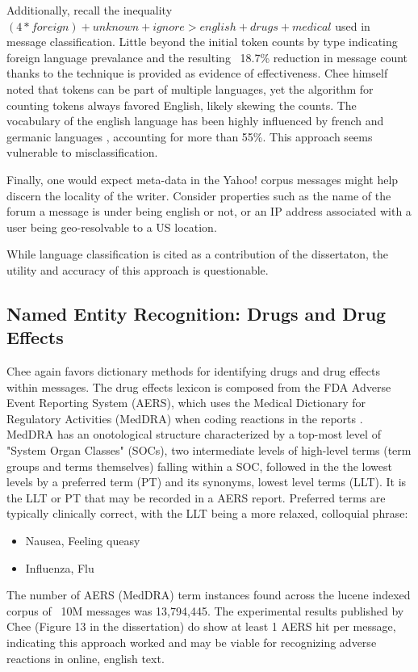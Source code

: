 \documentclass[twoside,11pt]{article}
\begin{document}
Additionally, recall the inequality $(4 * foreign) + unknown + ignore > english + drugs + medical$ used in message classification. Little beyond the initial token counts by type indicating foreign language prevalance and the resulting ~18.7\% reduction in message count thanks to the technique is provided as evidence of effectiveness. Chee himself noted that tokens can be part of multiple languages, yet the algorithm for counting tokens always favored English, likely skewing the counts. The vocabulary of the english language has been highly influenced by french and germanic languages \citep{Wikipedia page for english}, accounting for more than 55\%. This approach seems vulnerable to misclassification.

Finally, one would expect meta-data in the Yahoo! corpus messages might help discern the locality of the writer. Consider properties such as the name of the forum a message is under being english or not, or an IP address associated with a user being geo-resolvable to a US location.

While language classification is cited as a contribution of the dissertaton, the utility and accuracy of this approach is questionable.


\subsection{Named Entity Recognition: Drugs and Drug Effects}
Chee again favors dictionary methods for identifying drugs and drug effects within messages. The drug effects lexicon is composed from the FDA Adverse Event Reporting System (AERS), which uses the Medical Dictionary for Regulatory Activities (MedDRA) when coding reactions in the reports \citep{FAERS}. MedDRA has an onotological structure characterized by a top-most level of "System Organ Classes" (SOCs), two intermediate levels of high-level terms (term groups and terms themselves) falling within a SOC, followed in the the lowest levels by a preferred term (PT) and its synonyms, lowest level terms (LLT). It is the LLT or PT that may be recorded in a AERS report. Preferred terms are typically clinically correct, with the LLT being a more relaxed, colloquial phrase:
\begin{itemize}
  \item Nausea,  Feeling queasy
  \item Influenza,  Flu
\end{itemize}

The number of AERS (MedDRA) term instances found across the lucene indexed corpus of ~10M messages was 13,794,445. The experimental results published by Chee (Figure 13 in the dissertation) do show at least 1 AERS hit per message, indicating this approach worked and may be viable for recognizing adverse reactions in online, english text.
\end{document}
